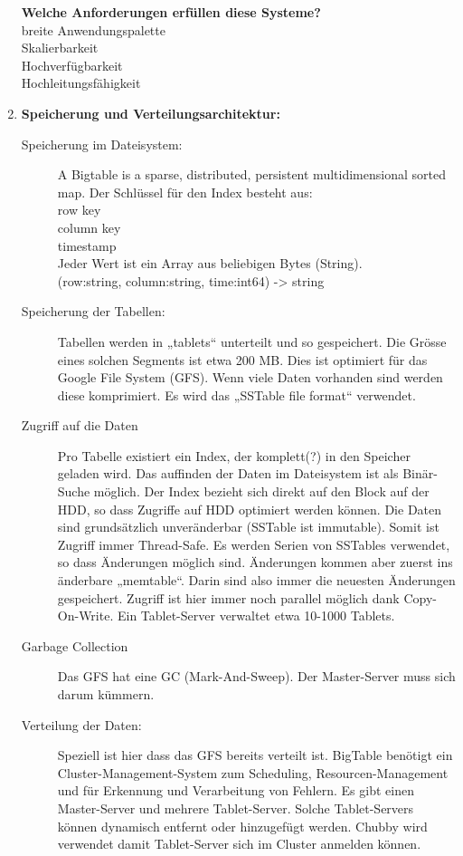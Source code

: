 \documentclass[a4paper,10pt,titlepage=false]{scrreprt}
\begin{document}
\begin{enumerate}
\textbf{Welche Anforderungen erfüllen diese Systeme?} \\
breite Anwendungspalette\\
Skalierbarkeit\\
Hochverfügbarkeit\\
Hochleitungsfähigkeit\\
\item \textbf{Speicherung und Verteilungsarchitektur:}\\
\begin{description}
  \item[Speicherung im Dateisystem:] A Bigtable is a sparse, distributed, persistent multidimensional sorted map.
Der Schlüssel für den Index besteht aus:\\
row key\\
column key\\
timestamp\\
Jeder Wert ist ein Array aus beliebigen Bytes (String).\\
(row:string, column:string, time:int64) -> string 
\item [Speicherung der Tabellen:]Tabellen werden in „tablets“ unterteilt und so gespeichert. Die Grösse eines solchen Segments ist etwa 200 MB. Dies ist optimiert für das Google File System (GFS). Wenn viele Daten vorhanden sind werden diese komprimiert. Es wird das „SSTable file format“ verwendet.
\item[Zugriff auf die Daten]Pro Tabelle existiert ein Index, der komplett(?) in den Speicher geladen wird. Das auffinden der Daten im Dateisystem ist als Binär-Suche möglich. Der Index bezieht sich direkt auf den Block auf der HDD, so dass Zugriffe auf HDD optimiert werden können.
Die Daten sind grundsätzlich unveränderbar (SSTable ist immutable). Somit ist Zugriff immer Thread-Safe. Es werden Serien von SSTables verwendet, so dass Änderungen möglich sind. Änderungen kommen aber zuerst ins änderbare „memtable“. Darin sind also immer die neuesten Änderungen gespeichert. Zugriff ist hier immer noch parallel möglich dank Copy-On-Write.
Ein Tablet-Server verwaltet etwa 10-1000 Tablets.
\item[Garbage Collection]Das GFS hat eine GC (Mark-And-Sweep). Der Master-Server muss sich darum kümmern.
\item[Verteilung der Daten:] Speziell ist hier dass das GFS bereits verteilt ist. BigTable benötigt ein Cluster-Management-System zum Scheduling, Resourcen-Management und für Erkennung und Verarbeitung von Fehlern. 
Es gibt einen Master-Server und mehrere Tablet-Server. Solche Tablet-Servers können dynamisch entfernt oder hinzugefügt werden. Chubby wird verwendet damit Tablet-Server sich im Cluster anmelden können.

\end{description}
\end{enumerate}
\end{document}

